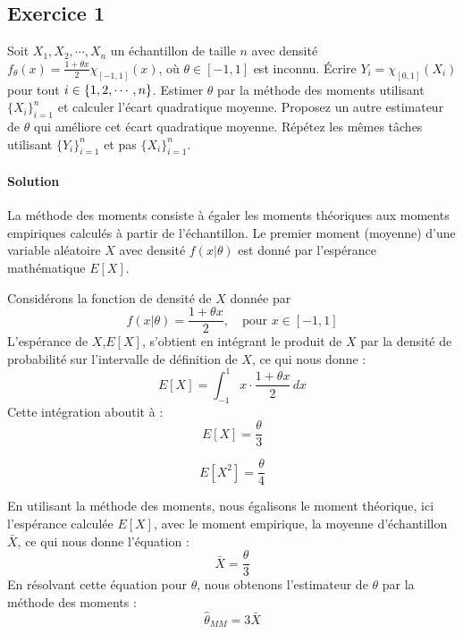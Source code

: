 \documentclass[../main.tex]{subfiles}
\begin{document}
\begin{CJK*}{UTF8}{gbsn}

\section*{Exercice 1}

Soit $X_1, X_2, \cdots, X_n$ un échantillon de taille $n$ avec densité 
$f_{\theta}(x) = \frac{1 + \theta x}{2} \chi_{[-1,1]}(x)$, 
où $\theta \in [-1,1]$ est inconnu. Écrire $Y_i = \chi_{[0,1]}(X_i)$
pour tout $i \in \left \{  1, 2, \cdots, n \right \}$.
Estimer $\theta$ par la méthode des moments utilisant $\{X_i\}_{i=1}^n$ et 
calculer l'écart quadratique moyenne. 
Proposez un autre estimateur de $\theta$ qui améliore cet écart quadratique moyenne.
Répétez les mêmes tâches utilisant $\{Y_i\}_{i=1}^n$ et pas $\{X_i\}_{i=1}^n$.

\paragraph{Solution}
La méthode des moments consiste à égaler les moments théoriques aux moments empiriques calculés à partir de l'échantillon. Le premier moment (moyenne) d'une variable aléatoire $X$ avec densité $f(x | \theta)$ est donné par l'espérance mathématique $E[X]$.

Considérons la fonction de densité de $X$ donnée par 
\begin{equation}
f(x | \theta) = \frac{1 + \theta x}{2}, \quad \text{pour } x \in [-1, 1]
\end{equation}
L'espérance de $X$,$E[X]$, s'obtient en intégrant le produit de $X$ par la densité de probabilité sur l'intervalle de définition de $X$, ce qui nous donne :
\begin{equation}
E[X] = \int_{-1}^{1} x \cdot \frac{1 + \theta x}{2} \, dx
\end{equation}
Cette intégration aboutit à :
\begin{equation}
E[X] = \frac{\theta}{3} 
\end{equation}

\begin{equation}
E[X^2] = \frac{\theta}{4} 
\end{equation}

En utilisant la méthode des moments, nous égalisons le moment théorique, ici l'espérance calculée $E[X]$, avec le moment empirique, la moyenne d'échantillon $\bar{X}$, ce qui nous donne l'équation :
\begin{equation}
\bar{X} = \frac{\theta}{3}
\end{equation}
En résolvant cette équation pour $\theta$, nous obtenons l'estimateur de $\theta$ par la méthode des moments :
\begin{equation}
\hat{\theta}_{MM} = 3\bar{X}
\end{equation}


\end{CJK*}
\end{document}
